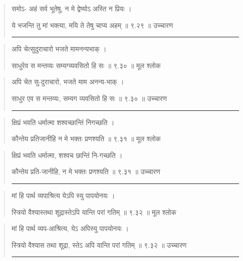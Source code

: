 \begin{quotation}

समोऽ- अहं सर्व भूतेषु, न मे द्वेष्योऽ अस्ति न प्रियः  ।  

ये भजन्ति तु मां भक्त्या, मयि ते तेषु चाप्य अहम्‌  ॥ ९.२९ ॥  उच्चारण

\noindent\rule{16cm}{0.4pt} 
\end{quotation}


\begin{quotation} 

अपि चेत्सुदुराचारो भजते मामनन्यभाक्‌  ।  

साधुरेव स मन्तव्यः सम्यग्व्यवसितो हि सः  ॥ ९.३० ॥  मूल श्लोक
\end{quotation}

\begin{quotation}

अपि चेत सु-दुराचारो, भजते माम अनन्य-भाक्‌  ।  

साधुर एव स मन्तव्यः, सम्यग व्यवसितो हि सः  ॥ ९.३० ॥  उच्चारण

\noindent\rule{16cm}{0.4pt} 
\end{quotation}


\begin{quotation} 

क्षिप्रं भवति धर्मात्मा शश्वच्छान्तिं निगच्छति  ।  

कौन्तेय प्रतिजानीहि न मे भक्तः प्रणश्यति  ॥ ९.३१ ॥  मूल श्लोक
\end{quotation}

\begin{quotation}

क्षिप्रं भवति धर्मात्मा, शश्वच छान्तिं नि-गच्छति  ।  

कौन्तेय प्रति-जानीहि, न मे भक्तः प्रणश्यति  ॥ ९.३१ ॥  उच्चारण

\noindent\rule{16cm}{0.4pt} 
\end{quotation}


\begin{quotation} 

मां हि पार्थ व्यपाश्रित्य येऽपि स्यु पापयोनयः  ।  

स्त्रियो वैश्यास्तथा शूद्रास्तेऽपि यान्ति परां गतिम्‌  ॥ ९.३२ ॥  मूल श्लोक
\end{quotation}

\begin{quotation}

मां हि पार्थ व्यप-आश्रित्य, येऽ अपिस्यु पापयोनयः  ।  

स्त्रियो वैश्यास तथा शूद्रा, स्तेऽ अपि यान्ति परां गतिम्‌  ॥ ९.३२ ॥  उच्चारण

\noindent\rule{16cm}{0.4pt} 
\end{quotation}


